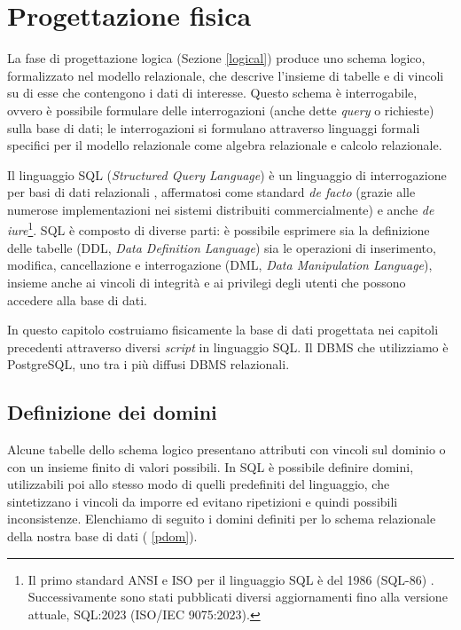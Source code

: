 \chapter{Progettazione fisica}

La fase di progettazione logica (Sezione \ref{logical}) produce uno schema logico, formalizzato nel modello relazionale, che descrive l'insieme di tabelle e di vincoli su di esse che contengono i dati di interesse.
Questo schema è interrogabile, ovvero è possibile formulare delle interrogazioni (anche dette \emph{query} o richieste) sulla base di dati; le interrogazioni si formulano attraverso linguaggi formali specifici per il modello relazionale come algebra relazionale e calcolo relazionale.

Il linguaggio SQL (\emph{Structured Query Language}) è un linguaggio di interrogazione per basi di dati relazionali \cite{Sil11}, affermatosi come standard \emph{de facto} (grazie alle numerose implementazioni nei sistemi distribuiti commercialmente) e anche \emph{de iure}\footnote{
Il primo standard ANSI e ISO per il linguaggio SQL è del 1986 (SQL-86) \cite{Sil11}. Successivamente sono stati pubblicati diversi aggiornamenti fino alla versione attuale, SQL:2023 (ISO/IEC 9075:2023).
}.
SQL è composto di diverse parti: è possibile esprimere sia la definizione delle tabelle (DDL, \emph{Data Definition Language}) sia le operazioni di inserimento, modifica, cancellazione e interrogazione (DML, \emph{Data Manipulation Language}), insieme anche ai vincoli di integrità e ai privilegi degli utenti che possono accedere alla base di dati.

In questo capitolo costruiamo fisicamente la base di dati progettata nei capitoli precedenti attraverso diversi \emph{script} in linguaggio SQL.
Il DBMS che utilizziamo è PostgreSQL, uno tra i più diffusi DBMS relazionali.

\section{Definizione dei domini}

Alcune tabelle dello schema logico presentano attributi con vincoli sul dominio o con un insieme finito di valori possibili.
In SQL è possibile definire domini, utilizzabili poi allo stesso modo di quelli predefiniti del linguaggio, che sintetizzano i vincoli da imporre ed evitano ripetizioni e quindi possibili inconsistenze.
Elenchiamo di seguito i domini definiti per lo schema relazionale della nostra base di dati (\lstlistingname{} \ref{pdom}).

